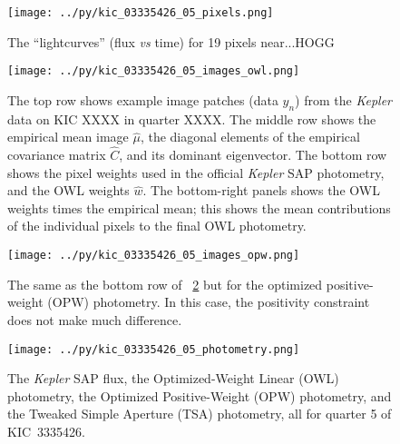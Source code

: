 \documentclass[12pt, letterpaper, preprint]{aastex}
\newcommand{\project}[1]{\textsl{#1}}
\newcommand{\foreign}[1]{\textsl{#1}}
\begin{document}
\clearpage
\begin{figure}
\texttt{[image: ../py/kic\_03335426\_05\_pixels.png]}
\caption{
The ``lightcurves'' (flux \foreign{vs} time) for 19 pixels near...HOGG
\label{fig:pixels}}
\end{figure}

\clearpage
\begin{figure}
\texttt{[image: ../py/kic\_03335426\_05\_images\_owl.png]}
\caption{
The top row shows example image patches (data $y_n$) from the \project{Kepler} data on KIC XXXX in quarter XXXX.
The middle row shows the empirical mean image $\hat{\mu}$,
  the diagonal elements of the empirical covariance matrix $\hat{C}$,
  and its dominant eigenvector.
The bottom row shows the pixel weights used in the official \project{Kepler} SAP photometry,
  and the OWL weights $\hat{w}$.
The bottom-right panels shows the OWL weights times the empirical mean;
  this shows the mean contributions of the individual pixels to the final OWL photometry.
\label{fig:images}}
\end{figure}

\clearpage
\begin{figure}
\texttt{[image: ../py/kic\_03335426\_05\_images\_opw.png]}
\caption{
The same as the bottom row of \figurename~\ref{fig:images}
  but for the optimized positive-weight (OPW) photometry.
In this case, the positivity constraint does not make much difference.
\label{fig:images_opw}}
\end{figure}

\clearpage
\begin{figure}
\texttt{[image: ../py/kic\_03335426\_05\_photometry.png]}
\caption{
The \project{Kepler} SAP flux,
  the Optimized-Weight Linear (OWL) photometry,
  the Optimized Positive-Weight (OPW) photometry,
  and the Tweaked Simple Aperture (TSA) photometry,
  all for quarter 5 of KIC~3335426.
\label{fig:results}}
\end{figure}
\end{document}
